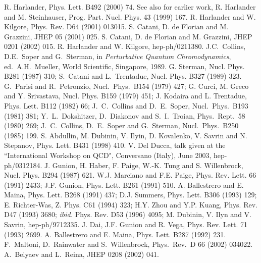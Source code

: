\begin{thebibliography}{999}
 R. Harlander, Phys. Lett. B492 (2000) 74.  
%
 See also for earlier work, R. Harlander and M. 
Steinhauser, Prog. Part. Nucl. Phys. 43 (1999) 167.    
%
 R. Harlander and W. Kilgore, Phys. Rev. D64 (2001) 013015.  
%
 S. Catani, D. de Florian and M. Grazzini, JHEP 05 (2001) 025. 
%
 S. Catani, D. de Florian and M. Grazzini, JHEP 0201 (2002) 
015. 
%
 R. Harlander and W. Kilgore, hep-ph/0211380.   
%
 J.C.\ Collins, D.E.\ Soper and G.\ Sterman, in {\it
Perturbative Quantum Chromodynamics}, ed.\ A.H.\ Mueller, World Scientific,
Singapore, 1989.
%
G. Sterman, Nucl. Phys. B281 (1987) 310; 
S.~Catani and L.~Trentadue, Nucl. Phys. B327 (1989) 323.
%
G.~Parisi and R.~Petronzio, Nucl.\ Phys.\ B154 (1979) 427;
G. Curci, M. Greco and Y. Srivastava, Nucl. Phys. B159 (1979) 451;  
J. Kodaira and L. Trentadue, Phys. Lett. B112 (1982) 66; 
J.~C.~Collins and D.~E.~Soper, Nucl.\ Phys.\ B193 (1981) 381;
Y.~L.~Dokshitzer, D.~Diakonov and S.~I.~Troian, Phys.\ Rept.\ 58 (1980) 269;
J.~C.~Collins, D.~E.~Soper and G.~Sterman, Nucl.\ Phys.\ B250 (1985) 199.
%
 S. Abdullin, M. Dubinin, V. Ilyin, D. Kovalenko, 
V. Savrin and N. Stepanov, Phys. Lett. B431 (1998) 410. 
%
 V. Del Ducca, talk given at the ``International Workshop 
on QCD", Conversano (Italy), June 2003, hep-ph/0312184.  
%
 J. Gunion, H. Haber, F. Paige, W.-K. Tung and S. 
Willenbrock, Nucl. Phys. B294 (1987) 621. 
%
W.J. Marciano and F.E. Paige, Phys. Rev. Lett. 66 (1991) 2433; 
J.F. Gunion, Phys. Lett. B261 (1991) 510.
%
 A. Ballestrero and E. Maina, Phys. Lett. B268 (1991)
437; D.J. Summers, Phys. Lett. B306 (1993) 129; E. Richter-Was, Z. Phys. C61 
(1994) 323; H.Y. Zhou and Y.P. Kuang, Phys. Rev. D47 (1993) 3680; {\it ibid.} 
Phys. Rev. D53 (1996) 4095; M. Dubinin, V. Ilyn and V. Savrin, hep-ph/9712335. 
%
 J. Dai, J.F. Gunion and R. Vega, Phys. Rev. Lett. 71
(1993) 2699.%
%
 A. Ballestrero and E. Maina, Phys. Lett. B287 (1992) 231. 
%
 F.~Maltoni, D.~Rainwater and S.~Willenbrock,
Phys.\ Rev.\ D 66 (2002) 034022. 
%
 A.~Belyaev and L.~Reina, JHEP 0208 (2002) 041.

\end{thebibliography}

